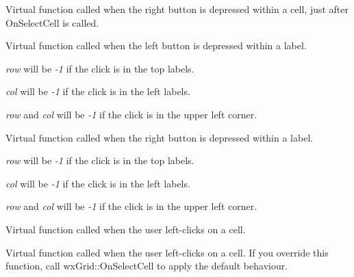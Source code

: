 \label{wxgridoncellrightclick}


Virtual function called when the right button is depressed within a cell, just after OnSelectCell is called.

\label{wxgridonlabelleftclick}


Virtual function called when the left button is depressed within a
label.

{\it row} will be {\it -1} if the click is in the top labels.

{\it col} will be {\it -1} if the click is in the left labels.

{\it row} and {\it col} will be {\it -1} if the click is in the upper
left corner.

\label{wxgridonlabelrightclick}


Virtual function called when the right button is depressed within a label.

{\it row} will be {\it -1} if the click is in the top labels.

{\it col} will be {\it -1} if the click is in the left labels.

{\it row} and {\it col} will be {\it -1} if the click is in the upper
left corner.

\label{wxgridonselectcell}


Virtual function called when the user left-clicks on a cell.

\label{wxgridonselectcellimplementation}


Virtual function called when the user left-clicks on a cell. If you override this function,
call wxGrid::OnSelectCell to apply the default behaviour.


